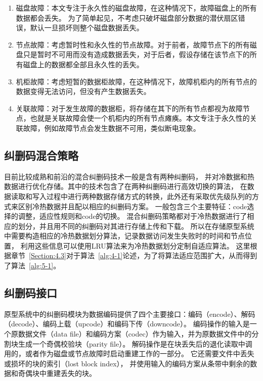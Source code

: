\begin{enumerate}
    \item 磁盘故障：本文专注于永久性的磁盘故障，在这种情况下，故障磁盘上的所有数据都会丢失。 为了简单起见，不考虑只破坏磁盘部分数据的潜伏扇区错误，默认一旦损坏则整个磁盘数据丢失。
    \item 节点故障：考虑暂时性和永久性的节点故障。对于前者，故障节点下的所有磁盘只是暂时不可用而没有造成数据丢失，对于后者，假设存储在该节点下的所有磁盘上的数据都全部且永久性的丢失。 
    \item 机柜故障：考虑短暂的数据柜故障，在这种情况下，故障机柜内的所有节点的数据变得无法访问，但没有产生数据丢失。
    \item 关联故障：对于发生故障的数据柜，将存储在其下的所有节点都视为故障节点，也就是关联故障会使一个机柜内的所有节点瘫痪。本文专注于永久性的关联故障，例如故障节点会发生数据不可用，类似断电现象。
\end{enumerate}

\subsection{纠删码混合策略}
\label{subsection:5.1.3}
目前比较成熟和前沿的混合纠删码技术一般是含有两种纠删码，
并对冷数据和热数据进行优化存储。其中的技术包含了在两种纠删码进行高效切换的算法，
在数据读取和写入过程中进行两种数据存储方式的转换，此外还有采取优先级队列的方式来区别冷热数据并且配以相应的纠删码方案。
一般包含三个主要特征：code选择的调整，适应性规则和code的切换。
混合纠删码策略都对于冷热数据进行了相应的划分，并且用不同的纠删码对其进行存储上传和下载。
所以在存储原型系统中需要构造相应的冷热数据划分算法，记录数据访问发生失败时的时间和节点位置，
利用这些信息可以使用LRU算法来为冷热数据划分定制自适应算法。
这里根据章节~\ref{Section:4.3}对于算法~\ref{alg:4-1}论述，为了将算法适应范围扩大，从而得到了算法~\ref{alg:5-1}。




\subsection{纠删码接口}
原型系统中的纠删码模块为数据编码提供了四个主要接口：编码（encode）、解码（decode）、编码上载（upcode）和编码下传（downcode）。 
编码操作的输入是一个原数据文件（data file）和编码方案（codec）作为输入，并为原数据文件中的分割块生成一个奇偶校验块（parity file）。 
解码操作是在块丢失后的退化读取中调用的，或者作为磁盘或节点故障时启动重建工作的一部分。 它还需要文件中丢失或损坏的块的索引（lost block index），
并使用输入的编码方案从条带中剩余的数据和奇偶块中重建丢失的块。

